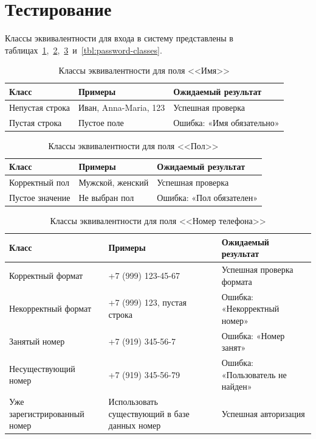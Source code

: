 \section{Тестирование}

Классы эквивалентности для входа в систему представлены в таблицах~\ref{tbl:name-classes},~\ref{tbl:gender-classes},~\ref{tbl:phone-classes}~и~\ref{tbl:password-classes}.

\begin{table}[h]
	\centering
	\caption{Классы эквивалентности для поля <<Имя>>}
	\label{tbl:name-classes}
	\begin{tabularx}{\textwidth}{|X|X|X|}
		\hline
		\textbf{Класс} & \textbf{Примеры} & \textbf{Ожидаемый результат} \\
		\hline
		Непустая строка & Иван, Anna-Maria, 123 & Успешная проверка \\
		\hline
		Пустая строка & Пустое поле & Ошибка: «Имя обязательно» \\
		\hline
	\end{tabularx}
\end{table}

\begin{table}[h]
	\centering
	\caption{Классы эквивалентности для поля <<Пол>>}
	\label{tbl:gender-classes}
	\begin{tabularx}{\textwidth}{|X|X|X|}
		\hline
		\textbf{Класс} & \textbf{Примеры} & \textbf{Ожидаемый результат} \\
		\hline
		Корректный пол & Мужской, женский & Успешная проверка \\
		\hline
		Пустое значение & Не выбран пол & Ошибка: «Пол обязателен» \\
		\hline
	\end{tabularx}
\end{table}

\begin{table}[h]
	\centering
	\caption{Классы эквивалентности для поля <<Номер телефона>>}
	\label{tbl:phone-classes}
	\begin{tabularx}{\textwidth}{|X|X|X|}
		\hline
		\textbf{Класс} & \textbf{Примеры} & \textbf{Ожидаемый результат} \\
		\hline
		Корректный формат & +7 (999) 123-45-67 & Успешная проверка формата \\
		\hline
		Некорректный формат & +7 (999) 123, пустая строка & Ошибка: «Некорректный номер» \\
		\hline
		Занятый номер & +7 (919) 345-56-7 & Ошибка: «Номер занят» \\
		\hline
		Несуществующий номер & +7 (919) 345-56-79 & Ошибка: «Пользователь не найден» \\
		\hline
		Уже зарегистрированный номер & Использовать существующий в базе данных номер & Успешная авторизация \\
		\hline
	\end{tabularx}
\end{table}

